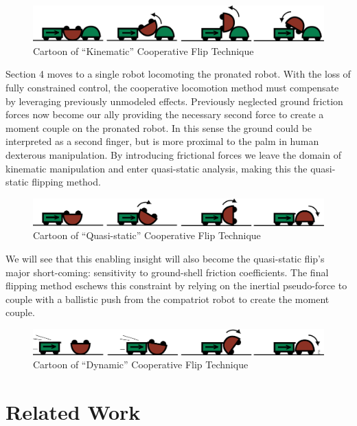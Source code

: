 \documentclass[letterpaper]{report}
\begin{document}
\begin{figure}[h]
\centering
\includegraphics[width=1.0\textwidth]{Kinematic_CoopCartoon.png}
\caption{Cartoon of ``Kinematic'' Cooperative Flip Technique}
\end{figure}

Section 4 moves to a single robot locomoting the pronated robot. With the loss of fully constrained control, the cooperative locomotion method must compensate by leveraging previously unmodeled effects.
Previously neglected ground friction forces now become our ally providing the necessary second force to create a moment couple on the pronated robot.
In this sense the ground could be interpreted as a second finger, but is more proximal to the palm in human dexterous manipulation.
By introducing frictional forces we leave the domain of kinematic manipulation and enter quasi-static analysis, making this the quasi-static flipping method.

\begin{figure}[h]
\centering
\includegraphics[width=1.0\textwidth]{QuasiStatic_CoopCartoon.png}
\caption{Cartoon of ``Quasi-static'' Cooperative Flip Technique}
\end{figure}

We will see that this enabling insight will also become the quasi-static flip's major short-coming: sensitivity to ground-shell friction coefficients.
The final flipping method eschews this constraint by relying on the inertial pseudo-force to couple with a ballistic push from the compatriot robot to create the moment couple.

\begin{figure}[h]
\centering
\includegraphics[width=1.0\textwidth]{Dynamic_CoopCartoon.png}
\caption{Cartoon of ``Dynamic'' Cooperative Flip Technique}
\end{figure}

\section{Related Work}
\end{document}

